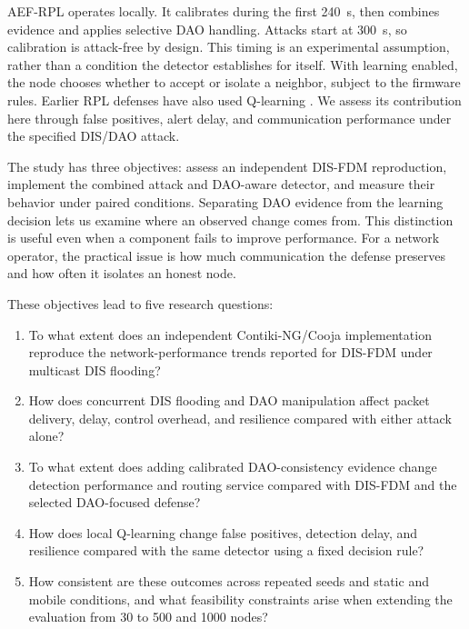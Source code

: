 \documentclass[journal]{IEEEtran}
\begin{document}
AEF-RPL operates locally. It calibrates during the first 240~s, then combines evidence and applies selective DAO handling. Attacks start at 300~s, so calibration is attack-free by design. This timing is an experimental assumption, rather than a condition the detector establishes for itself. With learning enabled, the node chooses whether to accept or isolate a neighbor, subject to the firmware rules. Earlier RPL defenses have also used Q-learning \cite{qsecrpl2023,itrpl2024}. We assess its contribution here through false positives, alert delay, and communication performance under the specified DIS/DAO attack.

The study has three objectives: assess an independent DIS-FDM reproduction, implement the combined attack and DAO-aware detector, and measure their behavior under paired conditions. Separating DAO evidence from the learning decision lets us examine where an observed change comes from. This distinction is useful even when a component fails to improve performance. For a network operator, the practical issue is how much communication the defense preserves and how often it isolates an honest node.

These objectives lead to five research questions:
\begin{enumerate}
\item[\emph{RQ1:}] To what extent does an independent Contiki-NG/Cooja implementation reproduce the network-performance trends reported for DIS-FDM under multicast DIS flooding?
\item[\emph{RQ2:}] How does concurrent DIS flooding and DAO manipulation affect packet delivery, delay, control overhead, and resilience compared with either attack alone?
\item[\emph{RQ3:}] To what extent does adding calibrated DAO-consistency evidence change detection performance and routing service compared with DIS-FDM and the selected DAO-focused defense?
\item[\emph{RQ4:}] How does local Q-learning change false positives, detection delay, and resilience compared with the same detector using a fixed decision rule?
\item[\emph{RQ5:}] How consistent are these outcomes across repeated seeds and static and mobile conditions, and what feasibility constraints arise when extending the evaluation from 30 to 500 and 1000 nodes?
\end{enumerate}
\end{document}
